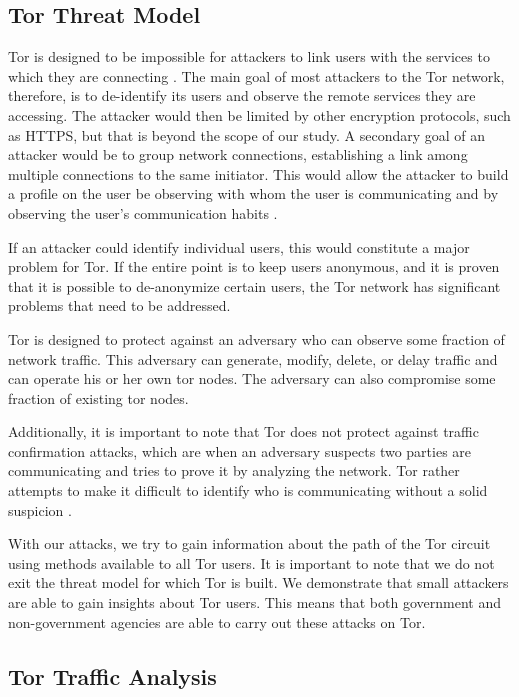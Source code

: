 \documentclass[12pt,journal]{IEEEtran}
\begin{document}
\subsection{Tor Threat Model}
Tor is designed to be impossible for attackers to link users with the services to which they are connecting \cite{Dingledine:2004:TSO:1251375.1251396}. The main goal of most attackers to the Tor network, therefore, is to de-identify its users and observe the remote services they are accessing. The attacker would then be limited by other encryption protocols, such as HTTPS, but that is beyond the scope of our study. A secondary goal of an attacker would be to group network connections, establishing a link among multiple connections to the same initiator. This would allow the attacker to build a profile on the user be observing with whom the user is communicating and by observing the user’s communication habits \cite{Murdoch:2005:LTA:1058433.1059390}.
\par
If an attacker could identify individual users, this would constitute a major problem for Tor. If the entire point is to keep users anonymous, and it is proven that it is possible to de-anonymize certain users, the Tor network has significant problems that need to be addressed.
\par
Tor is designed to protect against an adversary who can observe some fraction of network traffic. This adversary can generate, modify, delete, or delay traffic and can operate his or her own tor nodes. The adversary can also compromise some fraction of existing tor nodes\cite{Dingledine:2004:TSO:1251375.1251396}.
\par
Additionally, it is important to note that Tor does not protect against traffic confirmation attacks, which are when an adversary suspects two parties are communicating and tries to prove it by analyzing the network. Tor rather attempts to make it difficult to identify who is communicating without a solid suspicion \cite{Murdoch:2005:LTA:1058433.1059390}.
\par
With our attacks, we try to gain information about the path of the Tor circuit using methods available to all Tor users. It is important to note that we do not exit the threat model for which Tor is built. We demonstrate that small attackers are able to gain insights about Tor users. This means that both government and non-government agencies are able to carry out these attacks on Tor.
\subsection{Tor Traffic Analysis}
\end{document}
